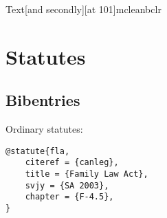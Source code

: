 Text[and secondly][\nopp at 101]{mcleanbclr}
\bigskip
\bigskip

\newpage

\bigskip

\par\bigskip
{}\par\bigskip
{}\par\bigskip
{}\par\bigskip
{}\par\bigskip
{}\par\bigskip
{}\par\bigskip
{}\par\bigskip\bigskip

\par\bigskip
{}\par\bigskip
{}\par\bigskip

%
%
%
%
%
%
%
%
%




\section{Statutes}
\subsection{Bibentries}

Ordinary statutes: \par\bigskip
\begin{verbatim}
@statute{fla,
	citeref = {canleg},
	title = {Family Law Act},
	svjy = {SA 2003},
	chapter = {F-4.5},
}
\end{verbatim}

